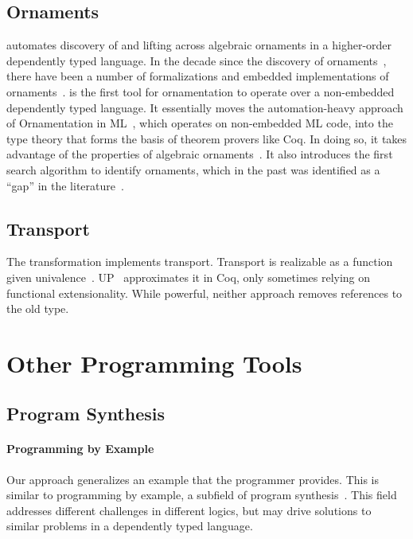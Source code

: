 \subsection{Ornaments}


\toolnameb automates discovery of and lifting across algebraic ornaments in a higher-order dependently typed language.
In the decade since the discovery of ornaments~\cite{mcbride}, there have been a number
of formalizations and embedded implementations of ornaments~\cite{Dagand:2013:CTO:2591370.2591396, ko2013relational, dagand2014transporting, ko2016programming, dagand2017essence}.
\toolnameb is the first tool for ornamentation to operate over a non-embedded dependently typed language.
It essentially moves the automation-heavy approach of Ornamentation in ML~\cite{Williams2017},
which operates on non-embedded ML code, into the type theory that forms the basis of theorem provers like Coq. 
In doing so, it takes advantage of the properties of algebraic ornaments~\cite{mcbride}.
It also introduces the first search algorithm to identify ornaments, which in the past 
was identified as a ``gap'' in the literature~\cite{ko2016programming}.

\subsection{Transport}

The \toolnamec transformation implements transport.
Transport is realizable as a function given univalence~\cite{univalent2013homotopy}.
UP~\cite{tabareau2017equivalences} approximates it
in Coq, only sometimes relying on functional extensionality.
While powerful, neither approach removes references to the old type. %

\section{Other Programming Tools}

\subsection{Program Synthesis}


\paragraph{Programming by Example}
Our approach generalizes an example that the programmer provides.
This is similar to programming by example, a subfield of 
program synthesis~\cite{DBLP:journals/ftpl/GulwaniPS17}. 
This field addresses different challenges in different logics,
but may drive solutions to similar problems in a dependently typed language.


